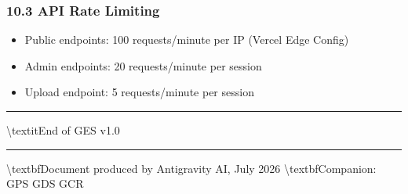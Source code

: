 \documentclass[11pt,a4paper]{article}
\begin{document}
\subsubsection*{10.3 API Rate Limiting}

\begin{itemize}
  \item Public endpoints: 100 requests/minute per IP (Vercel Edge Config)
  \item Admin endpoints: 20 requests/minute per session
  \item Upload endpoint: 5 requests/minute per session
\end{itemize}

\noindent\rule{\textwidth}{0.4pt}

\textbackslash{}textit{End of GES v1.0}

\noindent\rule{\textwidth}{0.4pt}
\textbackslash{}textbf{Document produced by Antigravity AI, July 2026}
\textbackslash{}textbf{Companion: GPS  GDS  GCR}
\end{document}
